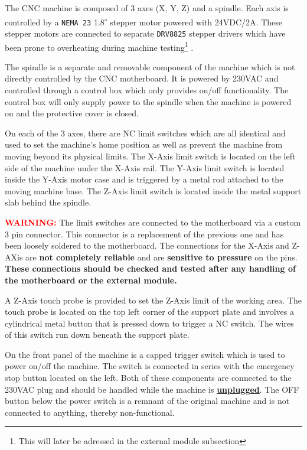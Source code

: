 \documentclass[11pt, openright]{book}
\begin{document}
        The CNC machine is composed of 3 axes (X, Y, Z) and a spindle. Each axis is controlled by a \texttt{NEMA 23} 1.8\textsuperscript{$\circ$} stepper motor powered with 24VDC/2A. These stepper motors are connected to separate \texttt{DRV8825} stepper drivers which have been prone to overheating during machine testing\footnote[1]{This will later be adressed in the external module subsection} . 

        The spindle is a separate and removable component of the machine which is not directly controlled by the CNC motherboard. It is powered by 230VAC and controlled through a control box which only provides on/off functionality. The control box will only supply power to the spindle when the machine is powered on and the protective cover is closed.

        On each of the 3 axes, there are NC limit switches which are all identical and used to set the machine's home position as well as prevent the machine from moving beyond its physical limits. The X-Axis limit switch is located on the left side of the machine under the X-Axis rail. The Y-Axis limit switch is located inside the Y-Axis motor case and is triggered by a metal rod attached to the moving machine base. The Z-Axis limit switch is located inside the metal support slab behind the spindle.

       
         \begin{dent}{\textcolor{red}{\textbf{WARNING:}}}
             The limit switches are connected to the motherboard via a custom 3 pin connector. This connector is a replacement of the previous one and has been loosely soldered to the motherboard. The connections for the X-Axis and Z-AXis are \textbf{not completely reliable} and are \textbf{sensitive to pressure} on the pins.
            \textbf{These connections should be checked and tested after any handling of the motherboard or the external module.}
        \end{dent}
        \vspace{5pt}

        A Z-Axis touch probe is provided to set the Z-Axis limit of the working area. 
        The touch probe is located on the top left corner of the support plate and involves a cylindrical metal button that is pressed down to trigger a NC switch. The wires of this switch run down beneath the support plate.  

        On the front panel of the machine is a capped trigger switch which is used to power on/off the machine. The switch is connected in series with the emergency stop button located on the left. Both of these components are connected to the 230VAC plug and should be handled while the machine is \ul{\textbf{unplugged}}. The OFF button below the power switch is a remnant of the original machine and is not connected to anything, thereby non-functional.
        
\end{document}
